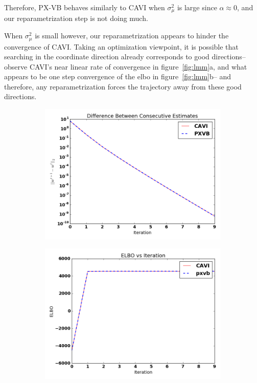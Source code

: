 \documentclass{article}
\begin{document}
Therefore, PX-VB behaves similarly to CAVI when $\sigma_\mu^2$ is large since $\alpha \approx 0$, and our reparametrization step is not doing much. 

When $\sigma_\mu^2$ is small however, our reparametrization appears to hinder the convergence of CAVI. Taking an optimization viewpoint, it is possible that searching in the coordinate direction already corresponds to good directions-- observe CAVI's near linear rate of convergence in figure~\ref{fig:lmm}a, and what appears to be one step convergence of the elbo in figure~\ref{fig:lmm}b-- and therefore, any reparametrization forces the trajectory away from these good directions. 



\begin{figure}[tb]
    \begin{subfigure}[t]{0.49\textwidth}
        \includegraphics[width=\textwidth]{LMM/pw_lmm_bigvar.png}
        \subcaption{}
    \end{subfigure}
          \begin{subfigure}[t]{0.49\textwidth}
        \includegraphics[width=\textwidth]{LMM/elbo_lmm_bigvar.png}

\end{subfigure}
\end{figure}
\end{document}
